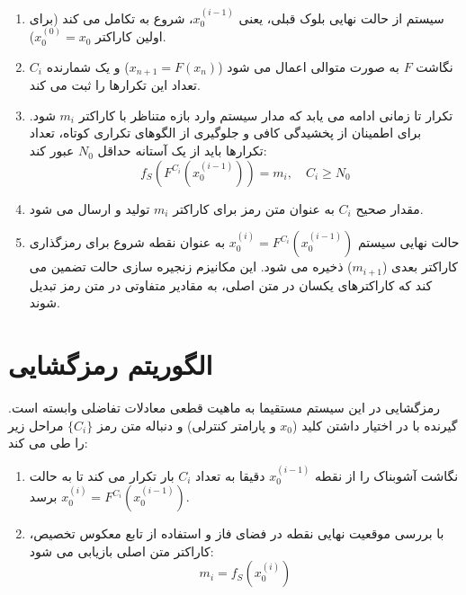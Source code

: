 \documentclass[12pt]{report}
\begin{document}
\begin{enumerate}[leftmargin=*]
    \item سیستم از حالت نهایی بلوک قبلی، یعنی $x_0^{(i-1)}$، شروع به تکامل می کند (برای اولین 
    کاراکتر $x_0^{(0)} = x_0$).
    
    \item نگاشت $F$ به صورت متوالی اعمال می شود ($x_{n+1} = F(x_n)$) و یک شمارنده $C_i$ تعداد 
    این تکرارها را ثبت می کند.
    
    \item تکرار تا زمانی ادامه می یابد که مدار سیستم وارد بازه متناظر با کاراکتر $m_i$ شود. برای 
    اطمینان از پخشیدگی کافی و جلوگیری از الگوهای تکراری کوتاه، 
    تعداد تکرارها باید از یک آستانه حداقل $N_0$ عبور کند:
    \begin{equation}
        f_S(F^{C_i}(x_0^{(i-1)})) = m_i, \quad C_i \ge N_0
    \end{equation}
   \noindent 
    \item مقدار صحیح $C_i$ به عنوان متن رمز برای کاراکتر $m_i$ تولید 
    و ارسال می شود.
    
    \item حالت نهایی سیستم $x_0^{(i)} = F^{C_i}(x_0^{(i-1)})$ به عنوان نقطه شروع برای رمزگذاری 
    کاراکتر بعدی ($m_{i+1}$) ذخیره می شود. این مکانیزم زنجیره سازی حالت 
    تضمین می کند که کاراکترهای یکسان در متن اصلی، به مقادیر متفاوتی در متن رمز تبدیل شوند.
\end{enumerate}

\section{الگوریتم رمزگشایی}
رمزگشایی در این سیستم مستقیما به ماهیت قطعی معادلات تفاضلی وابسته است. 
گیرنده با در اختیار داشتن کلید ($x_0$ و پارامتر کنترلی) و دنباله متن رمز $\{C_i\}$ مراحل زیر را 
طی می کند:

\begin{enumerate}
    \item نگاشت آشوبناک را از نقطه $x_0^{(i-1)}$ دقیقا به تعداد $C_i$ بار تکرار می کند تا به حالت 
    $x_0^{(i)} = F^{C_i}(x_0^{(i-1)})$ برسد.
    
    \item با بررسی موقعیت نهایی نقطه در فضای فاز و استفاده از تابع معکوس تخصیص، کاراکتر متن اصلی 
    بازیابی می شود:
    \begin{equation}
        m_i = f_S(x_0^{(i)})
    \end{equation}
\end{enumerate}
\end{document}

